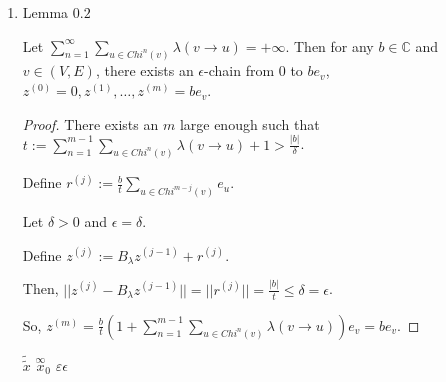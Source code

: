 \documentclass{article}
\begin{document}
\begin{enumerate}
\begin{proof}
\medskip

\centerline{$ = \displaystyle\sum^{n-1}_{m-1}
\hspace{0.2cm}\sum_{u\in Chi^m(v)}\hspace{-0.3cm}\lambda(v \rightarrow u) +1 \geq t$.}

Then since $t$ is arbitrarily large, we have,

\medskip

\centerline{$ \displaystyle\sum^{\infty}_{m-1}
\hspace{0.2cm}\sum_{u\in Chi^m(v)}\hspace{-0.3cm}\lambda(v\rightarrow u) = +\infty$} 
as desired.



\end{proof}





\item Lemma $0.2$

Let $\displaystyle\sum^{\infty}_{n=1} \sum_{u \in Chi^n(v)} \lambda(v \to u) = +\infty$. Then for any $b \in \mathbb{C}$ and $v \in (V,E)$, there exists an $\epsilon$-chain from $0$ to $be_v$, $z^{(0)}=0, z^{(1)}, \dots, z^{(m)}=be_v$.

\begin{proof}
    There exists an $m$ large enough such that $t:=\displaystyle\sum^{m-1}_{n=1} \sum_{u \in Chi^n(v)} \lambda(v \to u) + 1 > \frac{|b|}{\delta}$.

    Define $r^{(j)}:=\frac{b}{t} \sum_{u \in Chi^{m-j}(v)} e_u$.
    
    Let $\delta>0$ and $\epsilon = \delta$.
    
    Define $z^{(j)}:= B_\lambda z^{(j-1)} + r^{(j)}$.

    Then, $||z^{(j)}-B_\lambda z^{(j-1)}|| = ||r^{(j)}|| = \frac{|b|}{t} \leq \delta = \epsilon$.

    So, $z^{(m)} = \frac{b}{t} (1 + \sum^{m-1}_{n=1} \sum_{u \in Chi^n(v)} \lambda(v \to u)) e_v = be_v$.
\end{proof}

$\tilde{\tilde{x}}$ 
$\overset{\infty}{x}_0$
$\varepsilon \epsilon$


\end{enumerate}
\end{document}
